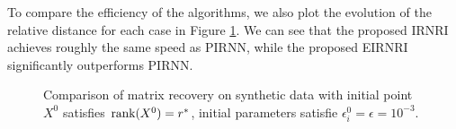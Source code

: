 \documentclass[twoside,11pt]{article}
\numberwithin{equation}{section}
\begin{document}
To compare the efficiency of the algorithms,  we also plot the evolution of the relative distance for each case in Figure \ref{fig_LLrate}.
We can see that the proposed IRNRI achieves roughly the same speed as PIRNN, while the proposed  EIRNRI significantly outperforms PIRNN.  
 
 
 
 
 
 
\begin{figure}[H]
\captionsetup{singlelinecheck=off, justification=raggedright}
\caption{Comparison of matrix recovery on synthetic data with initial point $X^{0}$ satisfies ${\rm rank}(X^{0}) = r^*$, initial parameters satisfie $\epsilon_{i}^{0} = \epsilon = 10^{-3}$. 
}
\label{fig_LLrate}
\end{figure}
\end{document}

